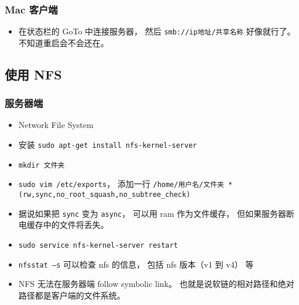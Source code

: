 \subsubsection{Mac 客户端}
\begin{itemize}
\item 在状态栏的 GoTo 中连接服务器， 然后 \verb|smb://ip地址/共享名称| 好像就行了。不知道重启会不会还在。
\end{itemize}

\subsection{使用 NFS}
\subsubsection{服务器端}
\begin{itemize}
\item Network File System
\item 安装 \verb|sudo apt-get install nfs-kernel-server|
\item \verb|mkdir 文件夹|
\item \verb|sudo vim /etc/exports|， 添加一行 \verb|/home/用户名/文件夹 *(rw,sync,no_root_squash,no_subtree_check)|
\item 据说如果把 \verb|sync| 变为 \verb|async|， 可以用 ram 作为文件缓存， 但如果服务器断电缓存中的文件将丢失。
\item \verb|sudo service nfs-kernel-server restart|
\item \verb|nfsstat –s| 可以检查 nfs 的信息， 包括 nfs 版本（v1 到 v4） 等
\item NFS 无法在服务器端 follow symbolic link。 也就是说软链的相对路径和绝对路径都是客户端的文件系统。

\end{itemize}

